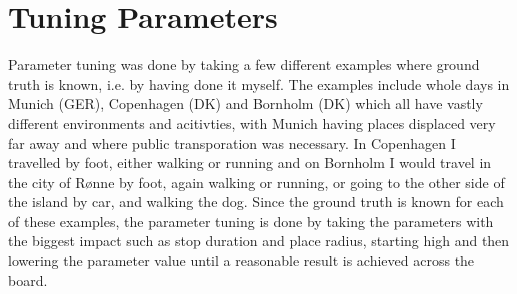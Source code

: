 \section{Tuning Parameters}
Parameter tuning was done by taking a few different examples where ground truth is  known, i.e. by having done it myself. The examples include whole days in Munich (GER), Copenhagen (DK) and Bornholm (DK) which all have vastly different environments and acitivties, with Munich having places displaced very far away and where public transporation was necessary. In Copenhagen I travelled by foot, either walking or running and on Bornholm I would travel in the city of Rønne by foot, again walking or running, or going to the other side of the island by car, and walking the dog. Since the ground truth is known for each of these examples, the parameter tuning is done by taking the parameters with the biggest impact such as stop duration and place radius, starting high and then lowering the parameter value until a reasonable result is achieved across the board.